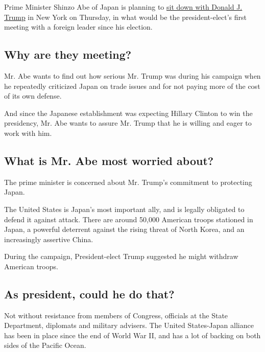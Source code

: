 Prime Minister Shinzo Abe of Japan is planning to
\href{http://www.nytimes3xbfgragh.onion/2016/11/11/world/asia/japan-donald-trump-shinzo-abe.html}{sit
down with Donald J. Trump} in New York on Thursday, in what would be the
president-elect's first meeting with a foreign leader since his
election.

\hypertarget{why-are-they-meeting}{%
\subsection{Why are they meeting?}\label{why-are-they-meeting}}

Mr. Abe wants to find out how serious Mr. Trump was during his campaign
when he repeatedly criticized Japan on trade issues and for not paying
more of the cost of its own defense.

And since the Japanese establishment was expecting Hillary Clinton to
win the presidency, Mr. Abe wants to assure Mr. Trump that he is willing
and eager to work with him.

\hypertarget{what-is-mr-abe-most-worried-about}{%
\subsection{What is Mr. Abe most worried
about?}\label{what-is-mr-abe-most-worried-about}}

The prime minister is concerned about Mr. Trump's commitment to
protecting Japan.

The United States is Japan's most important ally, and is legally
obligated to defend it against attack. There are around 50,000 American
troops stationed in Japan, a powerful deterrent against the rising
threat of North Korea, and an increasingly assertive China.

During the campaign, President-elect Trump suggested he might withdraw
American troops.

\hypertarget{as-president-could-he-do-that}{%
\subsection{As president, could he do
that?}\label{as-president-could-he-do-that}}

Not without resistance from members of Congress, officials at the State
Department, diplomats and military advisers. The United States-Japan
alliance has been in place since the end of World War II, and has a lot
of backing on both sides of the Pacific Ocean.

